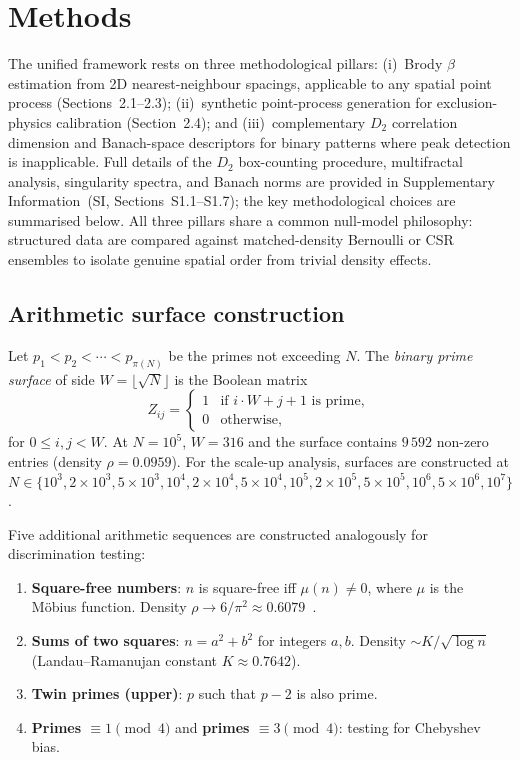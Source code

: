 \documentclass[final,3p,times,twocolumn]{elsarticle}
\theoremstyle{definition}
\begin{document}
\section{Methods}

The unified framework rests on three methodological pillars:
(i)~Brody $\beta$ estimation from 2D nearest-neighbour spacings,
applicable to any spatial point process (Sections~2.1--2.3);
(ii)~synthetic point-process generation for exclusion-physics
calibration (Section~2.4); and (iii)~complementary $D_2$ correlation
dimension and Banach-space descriptors for binary patterns where peak
detection is inapplicable. Full details of the $D_2$ box-counting
procedure, multifractal analysis, singularity spectra, and Banach
norms are provided in Supplementary Information~(SI, Sections~S1.1--S1.7);
the key methodological choices are summarised below. All three pillars
share a common null-model philosophy: structured data are compared against
matched-density Bernoulli or CSR ensembles to isolate genuine
spatial order from trivial density effects.

\subsection{Arithmetic surface construction}

Let $p_1 < p_2 < \cdots < p_{\pi(N)}$ be the primes not exceeding $N$.
The \emph{binary prime surface} of side $W = \lfloor\sqrt{N}\rfloor$ is
the Boolean matrix
\begin{equation}
  Z_{ij} = \begin{cases}
    1 & \text{if } i \cdot W + j + 1 \text{ is prime}, \\
    0 & \text{otherwise},
  \end{cases}
  \label{eq:binary}
\end{equation}
for $0 \leq i, j < W$. At $N=10^5$, $W=316$ and the surface contains
$9\,592$ non-zero entries (density $\rho = 0.0959$). For the scale-up
analysis, surfaces are constructed at
$N \in \{10^3, 2\times10^3, 5\times10^3, 10^4, 2\times10^4, 5\times10^4,
10^5, 2\times10^5, 5\times10^5, 10^6, 5\times10^6, 10^7\}$.

Five additional arithmetic sequences are constructed analogously for
discrimination testing:
\begin{enumerate}
  \item \textbf{Square-free numbers}: $n$ is square-free iff
        $\mu(n) \neq 0$, where $\mu$ is the M\"obius function.
        Density $\rho \to 6/\pi^2 \approx 0.6079$~\cite{HARDY-WRIGHT}.
  \item \textbf{Sums of two squares}: $n = a^2 + b^2$ for integers
        $a, b$. Density $\sim K/\sqrt{\log n}$ (Landau--Ramanujan
        constant $K \approx 0.7642$).
  \item \textbf{Twin primes (upper)}: $p$ such that $p-2$ is also prime.
  \item \textbf{Primes $\equiv 1 \pmod 4$} and
        \textbf{primes $\equiv 3 \pmod 4$}: testing for Chebyshev bias.
\end{enumerate}
\end{document}
